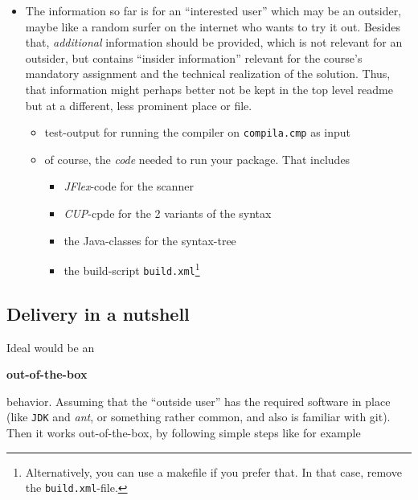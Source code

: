 \documentclass[10pt,freeform]{handout}[2014/08/13]
\begin{document}
\begin{itemize}
\item The information so far is for an ``interested user'' which may be an
  outsider, maybe like a random surfer on the internet who wants to try it
  out. Besides that, \emph{additional} information should be provided,
  which is not relevant for an outsider, but contains ``insider
  information'' relevant for the course's mandatory assignment and the
  technical realization of the solution. Thus, that information might
  perhaps better not be kept in the top level readme but at a different,
  less prominent place or file.
  \begin{itemize}
  \item test-output for running the compiler on \texttt{compila.cmp} as
    input
  \item of course, the \emph{code} needed to run your package. That
    includes
    \begin{itemize}
    \item \textsl{JFlex}-code for the scanner
    \item \textsl{CUP}-cpde for the 2 variants of the syntax
    \item the Java-classes for the syntax-tree
    \item the build-script \texttt{build.xml}\footnote{Alternatively, you
        can use a makefile if you prefer that. In that case, remove the
        \texttt{build.xml}-file.}
    \end{itemize}
  \end{itemize}
\end{itemize}



\subsection{Delivery in a nutshell}
\label{sec:delivery-nutshell}


Ideal would be an 
\begin{center}
  \textbf{out-of-the-box}
\end{center}
behavior. Assuming that the ``outside user'' has the required software in
place (like \texttt{JDK} and \emph{ant}, or something rather common, and
also is familiar with git). Then it works out-of-the-box, by following
simple steps like for example
\end{document}

